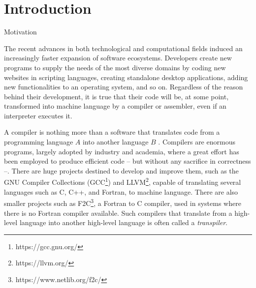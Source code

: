 \chapter{Introduction}
\label{cap:introducao}

\begin{section}{Motivation}\label{sec:motivation}

The recent advances in both technological and computational fields induced an
increasingly faster expansion of software ecosystems. Developers create new
programs to supply the needs of the most diverse domains by coding new websites
in scripting languages, creating standalone desktop applications, adding new
functionalities to an operating system, and so on. Regardless of the reason
behind their development, it is true that their code will be, at some
point, transformed into machine language by a compiler or assembler, even if an
interpreter executes it.



A compiler is nothing more than a software that translates code from a
programming language $A$ into another language $B$ \citep{dragonbook}.  Compilers
are enormous programs, largely adopted by industry and academia, where a great
effort has been employed to produce efficient code -- but without any sacrifice
in correctness --. There are huge projects destined to develop and improve
them, such as the GNU Compiler Collections (GCC\footnote{https://gcc.gnu.org/})
and LLVM\footnote{https://llvm.org/}, capable of translating several languages
such as C, C++, and Fortran, to machine language. There are also smaller
projects such as F2C\footnote{https://www.netlib.org/f2c/}, a Fortran to C
compiler, used in systems where there is no Fortran compiler available. Such
compilers that translate from a high-level language into another high-level
language is often called a \textit{transpiler}.


\end{section}

